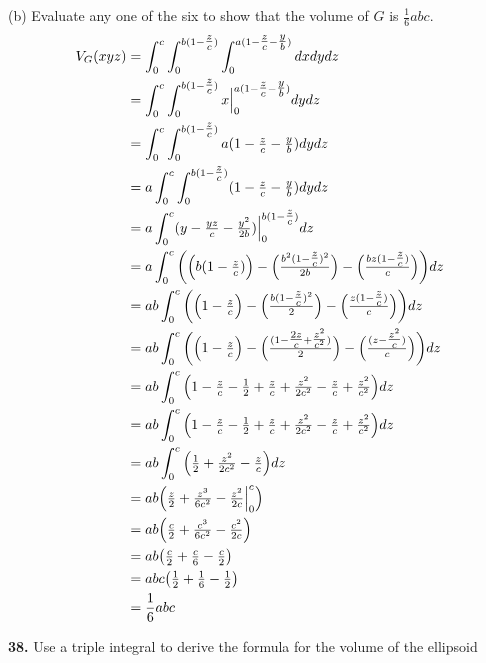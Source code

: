 \documentclass[11pt]{report}
\begin{document}
(b) Evaluate any one of the six to show that the volume of $G$ is $\tfrac{1}{6} abc$. \\
	\begin{align*}
		V_G(xyz)&=\int_0^{c}\int_0^{b(1-\tfrac{z}{c})}\int_0^{a(1-\tfrac{z}{c}-\tfrac{y}{b})}dxdydz\\
				&=\int_0^{c}\int_0^{b(1-\tfrac{z}{c})}x\Big|_0^{a(1-\tfrac{z}{c}-\tfrac{y}{b})}dydz\\
				&=\int_0^{c}\int_0^{b(1-\tfrac{z}{c})}a(1-\tfrac{z}{c}-\tfrac{y}{b})dydz\\
				&=a\int_0^{c}\int_0^{b(1-\tfrac{z}{c})}(1-\tfrac{z}{c}-\tfrac{y}{b})dydz\\
				&=a\int_0^{c}(y-\tfrac{yz}{c}-\tfrac{y^2}{2b})\Big|_0^{b(1-\tfrac{z}{c})}dz\\
				&=a\int_0^{c}\bigg( \Big( b(1-\tfrac{z}{c}) \Big)-\Big( \tfrac{b^2(1-\tfrac{z}{c})^2}{2b} \Big)-
					\Big( \tfrac{bz(1-\tfrac{z}{c})}{c} \Big) \bigg)dz\\
				&=ab\int_0^{c}\bigg( \Big( 1-\tfrac{z}{c} \Big)-\Big( \tfrac{b(1-\tfrac{z}{c})^2}{2} \Big)-
					\Big( \tfrac{z(1-\tfrac{z}{c})}{c} \Big) \bigg)dz\\
				&=ab\int_0^{c}\bigg( \Big( 1-\tfrac{z}{c} \Big)-\Big( \tfrac{(1-\tfrac{2z}{c}+\tfrac{z^2}{c^2})}{2} \Big)-
					\Big( \tfrac{(z-\tfrac{z^2}{c})}{c} \Big) \bigg)dz\\
				&=ab\int_0^{c}\Big( 1-\tfrac{z}{c}-\tfrac{1}{2}+\tfrac{z}{c}+\tfrac{z^2}{2c^2}-
					\tfrac{z}{c}+\tfrac{z^2}{c^2} \Big)dz\\
				&=ab\int_0^{c}\Big( 1-\tfrac{z}{c}-\tfrac{1}{2}+\tfrac{z}{c}+\tfrac{z^2}{2c^2}-
					\tfrac{z}{c}+\tfrac{z^2}{c^2} \Big)dz\\
				&=ab\int_0^{c}\Big( \tfrac{1}{2}+\tfrac{z^2}{2c^2}-\tfrac{z}{c} \Big)dz\\
				&=ab\Big( \tfrac{z}{2}+\tfrac{z^3}{6c^2}-\tfrac{z^2}{2c}\Big|_0^c \Big)\\
				&=ab\Big( \tfrac{c}{2}+\tfrac{c^3}{6c^2}-\tfrac{c^2}{2c} \Big)\\
				&=ab\big( \tfrac{c}{2}+\tfrac{c}{6}-\tfrac{c}{2} \big)\\
				&=abc\big( \tfrac{1}{2}+\tfrac{1}{6}-\tfrac{1}{2} \big)\\
				&=\frac{1}{6}abc\\
	\end{align*}

\textbf{38.} Use a triple integral to derive the formula for the volume of the ellipsoid
\end{document}
